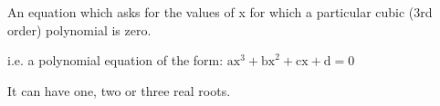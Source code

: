 An equation which asks for the values of x for which a particular cubic (3rd order)
polynomial is zero.
\par
i.e. a polynomial equation of the form: $ \mathrm{ax}^3 + \mathrm{bx}^2 + 
\mathrm{cx} + \mathrm{d} = 0 $
\par
It can have one, two or three real roots.